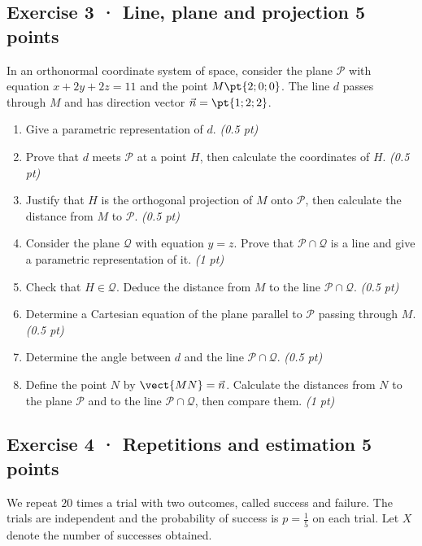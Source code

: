 \subsection*{Exercise 3 · Line, plane and projection \hfill 5 points}In an orthonormal coordinate system of space, consider the plane $\mathcal P$ with equation $x+2y+2z=11$ and the point $M\pt{2;0;0}$. The line $d$ passes through $M$ and has direction vector $\vec n=\pt{1;2;2}$.

\begin{enumerate}

\item Give a parametric representation of $d$. \hfill\textit{(0.5 pt)}

\item Prove that $d$ meets $\mathcal P$ at a point $H$, then calculate the coordinates of $H$. \hfill\textit{(0.5 pt)}

\item Justify that $H$ is the orthogonal projection of $M$ onto $\mathcal P$, then calculate the distance from $M$ to $\mathcal P$. \hfill\textit{(0.5 pt)}

\item Consider the plane $\mathcal Q$ with equation $y=z$. Prove that $\mathcal P\cap\mathcal Q$ is a line and give a parametric representation of it. \hfill\textit{(1 pt)}

\item Check that $H\in\mathcal Q$. Deduce the distance from $M$ to the line $\mathcal P\cap\mathcal Q$. \hfill\textit{(0.5 pt)}

\item Determine a Cartesian equation of the plane parallel to $\mathcal P$ passing through $M$. \hfill\textit{(0.5 pt)}

\item Determine the angle between $d$ and the line $\mathcal P\cap\mathcal Q$. \hfill\textit{(0.5 pt)}

\item Define the point $N$ by $\vect{MN}=\vec n$. Calculate the distances from $N$ to the plane $\mathcal P$ and to the line $\mathcal P\cap\mathcal Q$, then compare them. \hfill\textit{(1 pt)}

\end{enumerate}

\subsection*{Exercise 4 · Repetitions and estimation \hfill 5 points}We repeat $20$ times a trial with two outcomes, called success and failure. The trials are independent and the probability of success is $p=\frac{1}{5}$ on each trial. Let $X$ denote the number of successes obtained.

